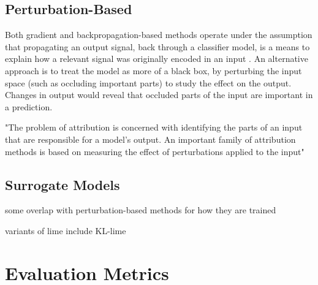 \documentclass[main]{subfiles}
\begin{document}
\subsection{Perturbation-Based}
Both gradient and backpropagation-based methods operate under the assumption that propagating an output signal, back through a classifier model, is a means to explain how a relevant signal was originally encoded in an input \cite{patternnet}. An alternative approach is to treat the model as more of a black box, by perturbing the input space (such as occluding important parts) to study the effect on the output. Changes in output would reveal that occluded parts of the input are important in a prediction. 

"The problem of attribution is concerned with identifying the parts of an input that are responsible for a model's output. An important family of attribution methods is based on measuring the effect of perturbations applied to the input"




\subsection{Surrogate Models}
some overlap with perturbation-based methods for how they are trained



variants of lime include KL-lime

\section{Evaluation Metrics}







\end{document}
